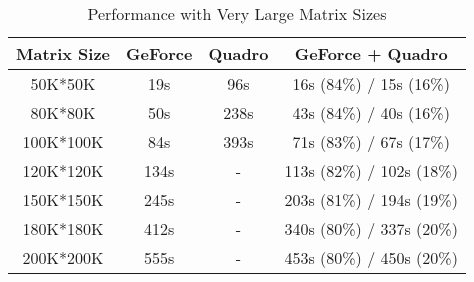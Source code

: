 \begin{table}[h]
\caption{Performance with Very Large Matrix Sizes}
\centering
\begin{tabular}{|c|c|c|c|}
\hline
Matrix Size & GeForce & Quadro & GeForce + Quadro \\ \hline
 50K*50K    &    19s  &   96s  &    16s (84\%) /  15s (16\%) \\ \hline
 80K*80K    &    50s  &  238s  &    43s (84\%) /  40s (16\%) \\ \hline
 100K*100K  &    84s  &  393s  &    71s (83\%) /  67s (17\%) \\ \hline
 120K*120K  &   134s  &     -  &   113s (82\%) / 102s (18\%) \\ \hline
 150K*150K  &   245s  &     -  &   203s (81\%) / 194s (19\%) \\ \hline
 180K*180K  &   412s  &     -  &   340s (80\%) / 337s (20\%) \\ \hline
 200K*200K  &   555s  &     -  &   453s (80\%) / 450s (20\%)  \\ \hline
\end{tabular}
\label{tab:hresult}
\vspace{-0.22in}
\end{table}
\fi

